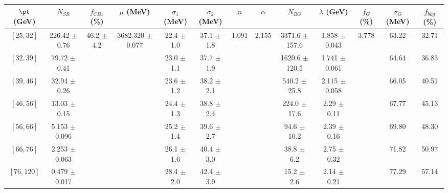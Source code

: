 \begin{tabular}{c||c|c|c|c|c|c|c|c|c|c|c||c}
$\pt$ (GeV) & $N_{SR}$ & $f_{CB1}$ (\%) & $\mu$ (MeV) & $\sigma_1$ (MeV) & $\sigma_2$ (MeV) & $n$ & $\alpha$ & $N_{BG}$ & $\lambda$ (GeV) & $f_G$ (\%) & $\sigma_G$ (MeV) & $f_{bkg}$ (\%) \\
\hline
$[25, 32]$ & 226.42 $\pm$ 0.76 & \multirow{7}{*}{46.2 $\pm$ 4.2} & \multirow{7}{*}{3682.320 $\pm$ 0.077} & 22.4 $\pm$ 1.0 & 37.1 $\pm$ 1.8 & \multirow{7}{*}{1.091} & \multirow{7}{*}{2.155} & 3371.6 $\pm$ 157.6 & 1.858 $\pm$ 0.043 & \multirow{7}{*}{3.778} & 63.22 & 32.71\\
$[32, 39]$ & 79.72 $\pm$ 0.41 &  &  & 23.0 $\pm$ 1.1 & 37.7 $\pm$ 1.9 &  &  & 1620.6 $\pm$ 120.5 & 1.741 $\pm$ 0.061 &  & 64.64 & 36.83\\
$[39, 46]$ & 32.94 $\pm$ 0.26 &  &  & 23.6 $\pm$ 1.2 & 38.2 $\pm$ 2.1 &  &  & 540.2 $\pm$ 25.8 & 2.115 $\pm$ 0.058 &  & 66.05 & 40.51\\
$[46, 56]$ & 13.03 $\pm$ 0.15 &  &  & 24.4 $\pm$ 1.3 & 38.8 $\pm$ 2.4 &  &  & 224.0 $\pm$ 17.6 & 2.29 $\pm$ 0.11 &  & 67.77 & 45.13\\
$[56, 66]$ & 5.153 $\pm$ 0.096 &  &  & 25.2 $\pm$ 1.4 & 39.6 $\pm$ 2.7 &  &  & 94.6 $\pm$ 10.2 & 2.39 $\pm$ 0.16 &  & 69.80 & 48.30\\
$[66, 76]$ & 2.253 $\pm$ 0.063 &  &  & 26.1 $\pm$ 1.6 & 40.4 $\pm$ 3.0 &  &  & 38.8 $\pm$ 6.2 & 2.75 $\pm$ 0.32 &  & 71.82 & 50.97\\
$[76, 120]$ & 0.479 $\pm$ 0.017 &  &  & 28.4 $\pm$ 2.0 & 42.4 $\pm$ 3.9 &  &  & 15.2 $\pm$ 2.6 & 2.14 $\pm$ 0.21 &  & 77.29 & 57.14\\
\end{tabular}
